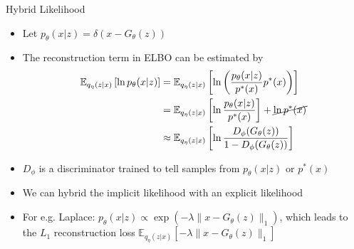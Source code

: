 \documentclass[compress]{beamer}
\newcommand{\expects}[2]{\mathbb{E}_{#1} \left[ #2 \right]}
\begin{document}
\begin{frame}[t]{Hybrid Likelihood}
    \begin{itemize}
        \item Let $p_{\theta}(x|z) = \delta(x-G_{\theta}(z))$
        \item The reconstruction term in ELBO can be estimated by
            \begin{align*}
                \expects{q_{\eta}(z|x)}{\ln p_{\theta}(x|z)} & = \expects{q_{\eta}(z|x)}{\ln \left( \frac{p_{\theta}(x|z)}{p^*(x)} p^*(x) \right)}   \\
                                                             & = \expects{q_{\eta}(z|x)}{\ln \frac{p_{\theta}(x|z)}{p^*(x)} } + \cancel{\ln p^*(x)}  \\
                                                             & \approx \expects{q_{\eta}(z|x)}{\ln \frac{D_\phi(G_{\theta}(z))}{1- D_\phi(G_{\theta}(z)) }}
            \end{align*}
        \item $D_{\phi}$ is a discriminator trained to tell samples from $p_{\theta}(x|z)$ or $p^*(x)$
        \item We can hybrid the implicit likelihood with an explicit likelihood 
        \item For e.g. Laplace: $p_\theta(x|z)\propto \exp(-\lambda\|x-G_{\theta}(z)\|_1)$, which leads to the $L_1$ reconstruction loss $\expects{q_{\eta}(z|x)}{-\lambda\|x-G_{\theta}(z)\|_1}$
    \end{itemize}
\end{frame}
\end{document}
